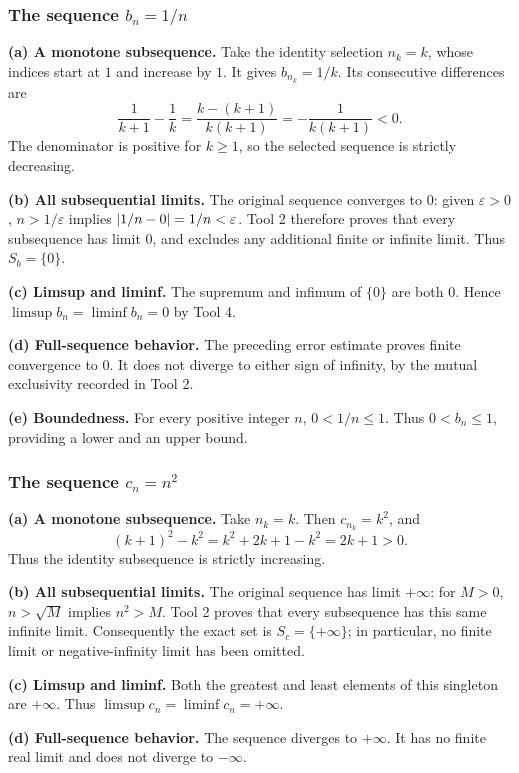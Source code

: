 \subsubsection*{The sequence $b_n=1/n$}

\textbf{(a) A monotone subsequence.}
Take the identity selection $n_k=k$, whose indices start at
$1$ and increase by $1$. It gives $b_{n_k}=1/k$.
Its consecutive differences are
\[
 \frac1{k+1}-\frac1k
 =\frac{k-(k+1)}{k(k+1)}
 =-\frac1{k(k+1)}<0.
\]
The denominator is positive for $k\geq1$, so the selected
sequence is strictly decreasing.

\textbf{(b) All subsequential limits.}
The original sequence converges to $0$: given
$\varepsilon>0$, $n>1/\varepsilon$ implies
$\left|1/n-0\right|=1/n<\varepsilon$.
Tool 2 therefore proves that every subsequence has limit $0$,
and excludes any additional finite or infinite limit. Thus
$S_b=\{0\}$.

\textbf{(c) Limsup and liminf.}
The supremum and infimum of $\{0\}$ are both $0$.
Hence $\limsup b_n=\liminf b_n=0$ by Tool 4.

\textbf{(d) Full-sequence behavior.}
The preceding error estimate proves finite convergence to $0$.
It does not diverge to either sign of infinity, by the
mutual exclusivity recorded in Tool 2.

\textbf{(e) Boundedness.}
For every positive integer $n$, $0<1/n\leq1$.
Thus $0<b_n\leq1$, providing a lower and an upper bound.

\subsubsection*{The sequence $c_n=n^2$}

\textbf{(a) A monotone subsequence.}
Take $n_k=k$. Then $c_{n_k}=k^2$, and
\[
 (k+1)^2-k^2=k^2+2k+1-k^2=2k+1>0.
\]
Thus the identity subsequence is strictly increasing.

\textbf{(b) All subsequential limits.}
The original sequence has limit $+\infty$: for $M>0$,
$n>\sqrt M$ implies $n^2>M$.
Tool 2 proves that every subsequence has this same infinite
limit. Consequently the exact set is $S_c=\{+\infty\}$;
in particular, no finite limit or negative-infinity limit
has been omitted.

\textbf{(c) Limsup and liminf.}
Both the greatest and least elements of this singleton are
$+\infty$. Thus
$\limsup c_n=\liminf c_n=+\infty$.

\textbf{(d) Full-sequence behavior.}
The sequence diverges to $+\infty$. It has no finite real
limit and does not diverge to $-\infty$.

